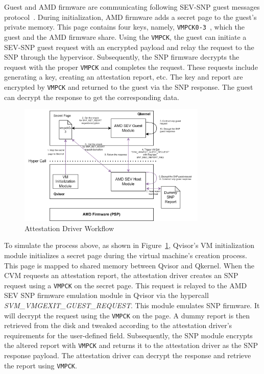 Guest and AMD firmware are communicating following SEV-SNP guest messages protocol~\cite*{snp_firmware}. During initialization, AMD firmware adds a secret page to the guest's private memory. This page contains four keys, namely, \texttt{VMPCK0-3}~\cite*{snp_firmware}, which the guest and the 
AMD firmware share. Using the \texttt{VMPCK},  the guest can initiate a SEV-SNP guest request with an encrypted payload and relay the request to the SNP through the hypervisor. Subsequently, the SNP firmware decrypts the request with the proper \texttt{VMPCK} and completes the request. 
These requests include generating a key, creating an attestation report, etc. The key and report are encrypted by \texttt{VMPCK} and returned to the guest via the SNP response. The guest can decrypt the response to get the corresponding data.

\begin{figure}[htp]
    \centering
    \includegraphics[width=0.8\textwidth]{images/amd_snp_driver.png}
    \caption[Attestation Driver Workflow]{Attestation Driver Workflow}
    \label{fig:amd_snp_driver}
\end{figure}

To simulate the process above, as shown in Figure~\ref{fig:amd_snp_driver}, Qvisor's VM initialization module initializes a secret page during the virtual machine's creation process. This page is mapped to shared memory between Qvisor and Qkernel. When the \acrshort{CVM} requests an attestation 
report, the attestation driver creates an  SNP request using a \texttt{VMPCK} on the secret page. This request is relayed to the AMD SEV SNP firmware emulation module in Qvisor via the hypercall \emph{SVM\_VMGEXIT\_GUEST\_REQUEST}. This module emulates SNP firmware. It will decrypt the request 
using the \texttt{VMPCK} on the page. A dummy report is then retrieved from the disk and tweaked according to the attestation driver's requirements for the user-defined field. Subsequently, the SNP module encrypts the altered report with \texttt{VMPCK} and returns it to the attestation driver as 
the SNP response payload. The attestation driver can decrypt the response and retrieve the report using \texttt{VMPCK}.

